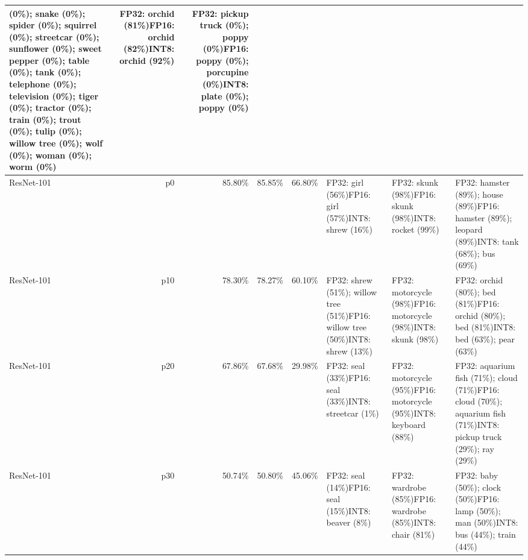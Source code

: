 \begin{longtable}{p{2.8cm} r r r r p{5.0cm} p{4.2cm} p{4.2cm}}
(0\%); snake (0\%); spider (0\%); squirrel (0\%); streetcar (0\%); sunflower (0\%); sweet pepper (0\%); table (0\%); tank (0\%); telephone (0\%); television (0\%); tiger (0\%); tractor (0\%); train (0\%); trout (0\%); tulip (0\%); willow tree (0\%); wolf (0\%); woman (0\%); worm (0\%) & FP32: orchid (81\%)\newline FP16: orchid (82\%)\newline INT8: orchid (92\%) & FP32: pickup truck (0\%); poppy (0\%)\newline FP16: poppy (0\%); porcupine (0\%)\newline INT8: plate (0\%); poppy (0\%) \\ \hline
ResNet-101 & p0 & 85.80\% & 85.85\% & 66.80\% & FP32: girl (56\%)\newline FP16: girl (57\%)\newline INT8: shrew (16\%) & FP32: skunk (98\%)\newline FP16: skunk (98\%)\newline INT8: rocket (99\%) & FP32: hamster (89\%); house (89\%)\newline FP16: hamster (89\%); leopard (89\%)\newline INT8: tank (68\%); bus (69\%) \\ \hline
ResNet-101 & p10 & 78.30\% & 78.27\% & 60.10\% & FP32: shrew (51\%); willow tree (51\%)\newline FP16: willow tree (50\%)\newline INT8: shrew (13\%) & FP32: motorcycle (98\%)\newline FP16: motorcycle (98\%)\newline INT8: skunk (98\%) & FP32: orchid (80\%); bed (81\%)\newline FP16: orchid (80\%); bed (81\%)\newline INT8: bed (63\%); pear (63\%) \\ \hline
ResNet-101 & p20 & 67.86\% & 67.68\% & 29.98\% & FP32: seal (33\%)\newline FP16: seal (33\%)\newline INT8: streetcar (1\%) & FP32: motorcycle (95\%)\newline FP16: motorcycle (95\%)\newline INT8: keyboard (88\%) & FP32: aquarium fish (71\%); cloud (71\%)\newline FP16: cloud (70\%); aquarium fish (71\%)\newline INT8: pickup truck (29\%); ray (29\%) \\ \hline
ResNet-101 & p30 & 50.74\% & 50.80\% & 45.06\% & FP32: seal (14\%)\newline FP16: seal (15\%)\newline INT8: beaver (8\%) & FP32: wardrobe (85\%)\newline FP16: wardrobe (85\%)\newline INT8: chair (81\%) & FP32: baby (50\%); clock (50\%)\newline FP16: lamp (50\%); man (50\%)\newline INT8: bus (44\%); train (44\%) \\ \hline

\end{longtable}
